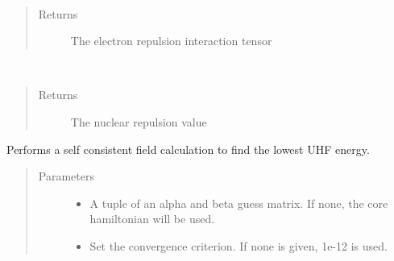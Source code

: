 \documentclass[letterpaper,10pt,english]{sphinxmanual}
\begin{document}
\begin{fulllineitems}
\begin{fulllineitems}
\label{\detokenize{UHF:hf.HartreeFock.UHF.MF.get_two_e}}~\begin{quote}\begin{description}
\item[{Returns}] \leavevmode
The electron repulsion interaction tensor

\end{description}\end{quote}

\end{fulllineitems}


\begin{fulllineitems}
\label{\detokenize{UHF:hf.HartreeFock.UHF.MF.nuc_rep}}~\begin{quote}\begin{description}
\item[{Returns}] \leavevmode
The nuclear repulsion value

\end{description}\end{quote}

\end{fulllineitems}


\begin{fulllineitems}
\label{\detokenize{UHF:hf.HartreeFock.UHF.MF.scf}}
Performs a self consistent field calculation to find the lowest UHF energy.
\begin{quote}\begin{description}
\item[{Parameters}] \leavevmode\begin{itemize}
\item {} 
 \textendash{} A tuple of an alpha and beta guess matrix. If none, the core hamiltonian will be used.

\item {} 
 \textendash{} Set the convergence criterion. If none is given, 1e-12 is used.


\end{itemize}
\end{description}
\end{quote}
\end{fulllineitems}
\end{fulllineitems}
\end{document}
